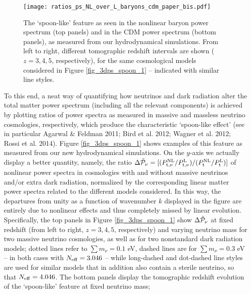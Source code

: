 \documentclass{emulateapj}
\begin{document}

\begin{figure*}
\centering
\texttt{[image: ratios\_ps\_NL\_over\_L\_baryons\_cdm\_paper\_bis.pdf]}   
\caption{The `spoon-like' feature as seen in the nonlinear baryon power spectrum (top panels) and in the CDM power spectrum (bottom panels), as measured from our hydrodynamical simulations. 
From left to right, different tomographic redshift intervals are shown ($z=3,4,5$, respectively), for the same cosmological models 
considered in Figure \ref{fig_3dps_spoon_1} -- indicated with similar line styles.}
\label{fig_3dps_spoon_2}
\end{figure*}

 
To this end, a neat way of quantifying how neutrinos and dark radiation alter 
the total matter power spectrum (including all the relevant components) is achieved by plotting  ratios of power spectra 
as measured in massive and massless neutrino cosmologies, respectively, which
produce  the characteristic  `spoon-like effect' (see in particular
Agarwal \& Feldman 2011; Bird et al. 2012; Wagner et al. 2012; Rossi et al. 2014). 
Figure \ref{fig_3dps_spoon_1} shows examples of this feature as measured from our 
new hydrodynamical simulations.
On the $y$-axis we actually display a better quantity, namely, the ratio
$\Delta \tilde{\cal{P}}_{\nu}=[(P^{\rm NL}_{\rm t,\nu}/P^{\rm L}_{\rm t,\nu})/(P^{\rm NL}_{\rm t}/P^{\rm L}_{\rm t})]$
of nonlinear power spectra in cosmologies with and without massive neutrinos and/or extra dark radiation, 
normalized by the corresponding linear matter power spectra related to the different models considered.
In this way, the departures from unity as a function of wavenumber $k$ displayed in the figure are entirely due to nonlinear effects and 
thus completely missed by linear evolution. 
Specifically, the top panels in Figure \ref{fig_3dps_spoon_1}  show
$\Delta \tilde{\cal{P}}_{\nu}$ 
at fixed redshift (from left to right, $z=3,4,5$, respectively) and varying neutrino mass
for two massive neutrino cosmologies, as well as for two nonstandard dark radiation models;
dotted lines refer to $\sum m_{\nu}=0.1$ eV, dashed lines are for $\sum m_{\nu}=0.3$ eV -- in both cases with $N_{\rm eff}=3.046$ --
while long-dashed and dot-dashed line styles are used for similar models that in addition also contain a  
sterile neutrino, so that $N_{\rm eff} =4.046$. 
The bottom panels display the tomographic redshift evolution of the  `spoon-like' feature at fixed neutrino mass;
\end{document}
